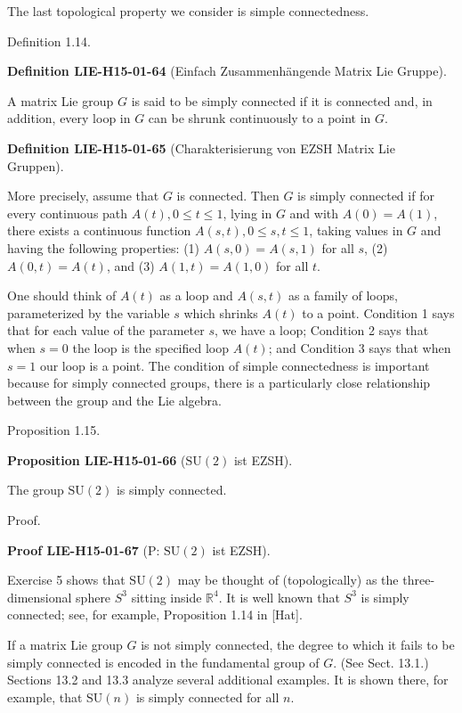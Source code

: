 \documentclass[10pt, letterpaper]{article}
\newcommand{\SU}{\mathrm{SU}}
\newcommand{\CustomHeading}[3]{%
  \par\medskip\noindent%
  \textbf{#1 #2} \textnormal{(#3)}.\enskip%
}
\newenvironment{DEF}[2]{\begin{unitbox}\CustomHeading{Definition}{#1}{#2}}{\end{unitbox}}
\newenvironment{PROP}[2]{\begin{unitbox}\CustomHeading{Proposition}{#1}{#2}}{\end{unitbox}}
\newenvironment{PROOF}[2]{\begin{unitbox}\CustomHeading{Proof}{#1}{#2}}{\end{unitbox}}
\begin{document}
The last topological property we consider is simple connectedness.

Definition 1.14. 


\begin{DEF}{LIE-H15-01-64}{Einfach Zusammenhängende Matrix Lie Gruppe}
A matrix Lie group $G$ is said to be simply connected if it is connected and, in addition, every loop in $G$ can be shrunk continuously to a point in $G$.
\end{DEF}


\begin{DEF}{LIE-H15-01-65}{Charakterisierung von EZSH Matrix Lie Gruppen}
More precisely, assume that $G$ is connected. Then $G$ is simply connected if for every continuous path $A(t), 0 \leq t \leq 1$, lying in $G$ and with $A(0)=A(1)$, there exists a continuous function $A(s, t), 0 \leq s, t \leq 1$, taking values in $G$ and having the following properties: (1) $A(s, 0)=A(s, 1)$ for all $s$, (2) $A(0, t)=A(t)$, and (3) $A(1, t)=A(1,0)$ for all $t$.

One should think of $A(t)$ as a loop and $A(s, t)$ as a family of loops, parameterized by the variable $s$ which shrinks $A(t)$ to a point. Condition 1 says that for each value of the parameter $s$, we have a loop; Condition 2 says that when $s=0$ the loop is the specified loop $A(t)$; and Condition 3 says that when $s=1$ our loop is a point. The condition of simple connectedness is important because for simply connected groups, there is a particularly close relationship between the group and the Lie algebra.
\end{DEF}

Proposition 1.15. 


\begin{PROP}{LIE-H15-01-66}{$\SU(2)$ ist EZSH}
The group $\mathrm{SU}(2)$ is simply connected.
\end{PROP}


Proof. 

\begin{PROOF}{LIE-H15-01-67}{P: $\SU(2)$ ist EZSH}
Exercise 5 shows that $\mathrm{SU}(2)$ may be thought of (topologically) as the three-dimensional sphere $S^{3}$ sitting inside $\mathbb{R}^{4}$. It is well known that $S^{3}$ is simply connected; see, for example, Proposition 1.14 in [Hat].
\end{PROOF}


If a matrix Lie group $G$ is not simply connected, the degree to which it fails to be simply connected is encoded in the fundamental group of $G$. (See Sect. 13.1.) Sections 13.2 and 13.3 analyze several additional examples. It is shown there, for example, that $\mathrm{SU}(n)$ is simply connected for all $n$.
\end{document}
